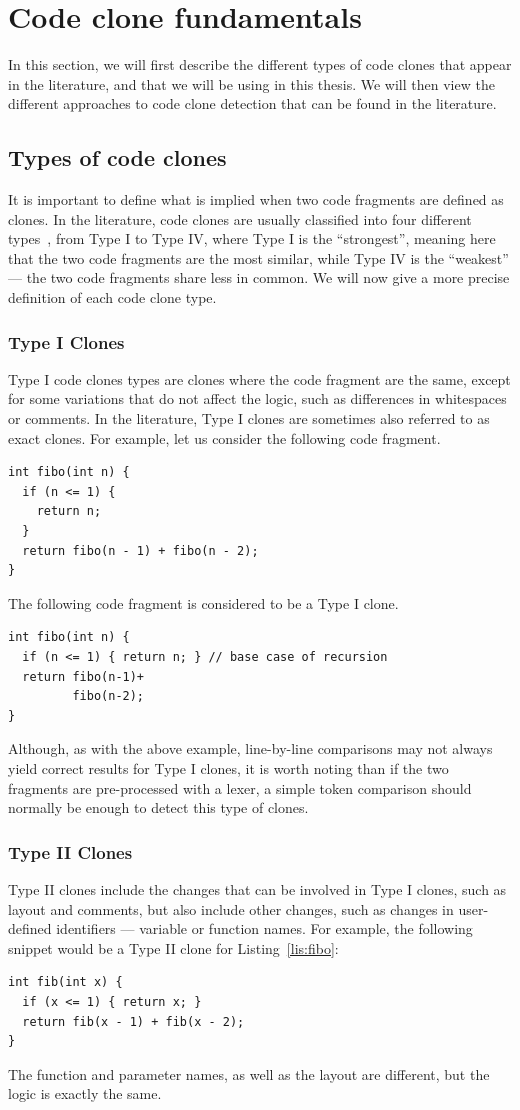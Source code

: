 \section{Code clone fundamentals}
In this section, we will first describe the different types of code clones
that appear in the literature, and that we will be using in this thesis.
We will then view the different approaches to code clone detection that can be
found in the literature.
\subsection{Types of code clones}
It is important to define what is implied when two code fragments are
defined as clones. In the literature, code clones are usually
classified into four different types~\cite{Roy07asurvey}, from Type I to Type IV,
where Type I is the ``strongest'', meaning here that the two code fragments are
the most similar, while Type IV is the ``weakest'' --- the two code fragments
share less in common. We will now give a more precise definition of each code
clone type.
\subsubsection{Type I Clones}
Type I code clones types are clones where the code fragment are the same,
except for some variations that do not affect the logic, such as differences
in whitespaces or comments. In the literature, Type I clones are sometimes also
referred to as exact clones.
For example, let us consider the following code fragment.
\begin{lstlisting}[caption=Fibonacci function,label=lis:fibo]
int fibo(int n) {
  if (n <= 1) {
    return n;
  }
  return fibo(n - 1) + fibo(n - 2);
}
\end{lstlisting}

The following code fragment is considered to be a Type I clone.
\begin{lstlisting}
int fibo(int n) {
  if (n <= 1) { return n; } // base case of recursion
  return fibo(n-1)+
         fibo(n-2);
}
\end{lstlisting}

Although, as with the above example, line-by-line comparisons may not always
yield correct results for Type I clones, it is worth noting than if the two
fragments are pre-processed with a lexer, a simple token comparison should
normally be enough to detect this type of clones.
\subsubsection{Type II Clones}
Type II clones include the changes that can be involved in Type I clones, such
as layout and comments, but also include other changes, such as changes in
user-defined identifiers --- variable or function names. For example, the
following snippet would be a Type II clone for Listing~\ref{lis:fibo}:
\begin{lstlisting}
int fib(int x) {
  if (x <= 1) { return x; }
  return fib(x - 1) + fib(x - 2);
}
\end{lstlisting}
The function and parameter names, as well as the layout are different, but the
logic is exactly the same.
